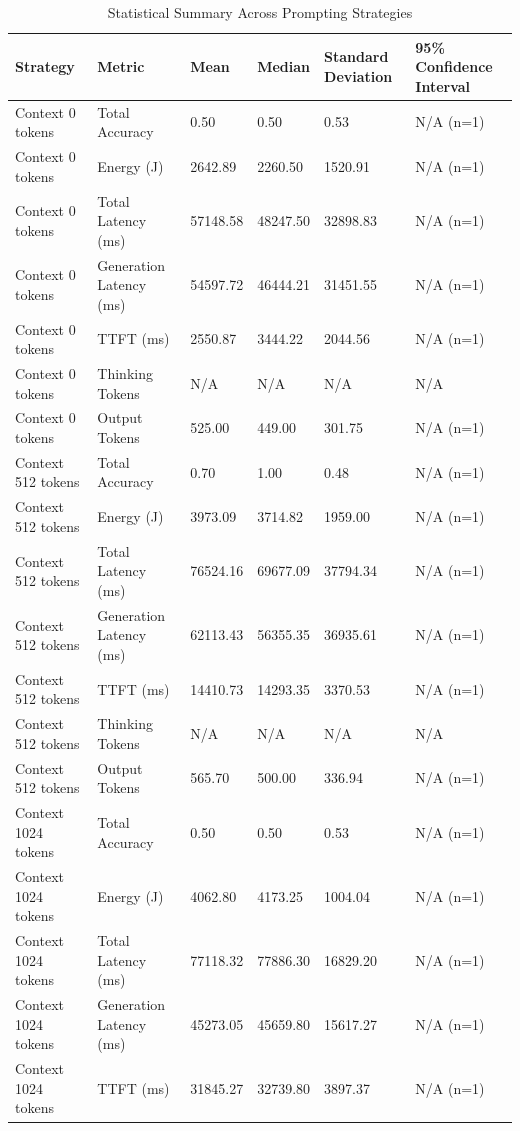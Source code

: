 \begin{table}
\caption{Statistical Summary Across Prompting Strategies}
\label{tab:statistical_summary}
\begin{tabular}{llllll}
\toprule
Strategy & Metric & Mean & Median & Standard Deviation & 95\% Confidence Interval \\
\midrule
Context 0 tokens & Total Accuracy & 0.50 & 0.50 & 0.53 & N/A (n=1) \\
Context 0 tokens & Energy (J) & 2642.89 & 2260.50 & 1520.91 & N/A (n=1) \\
Context 0 tokens & Total Latency (ms) & 57148.58 & 48247.50 & 32898.83 & N/A (n=1) \\
Context 0 tokens & Generation Latency (ms) & 54597.72 & 46444.21 & 31451.55 & N/A (n=1) \\
Context 0 tokens & TTFT (ms) & 2550.87 & 3444.22 & 2044.56 & N/A (n=1) \\
Context 0 tokens & Thinking Tokens & N/A & N/A & N/A & N/A \\
Context 0 tokens & Output Tokens & 525.00 & 449.00 & 301.75 & N/A (n=1) \\
Context 512 tokens & Total Accuracy & 0.70 & 1.00 & 0.48 & N/A (n=1) \\
Context 512 tokens & Energy (J) & 3973.09 & 3714.82 & 1959.00 & N/A (n=1) \\
Context 512 tokens & Total Latency (ms) & 76524.16 & 69677.09 & 37794.34 & N/A (n=1) \\
Context 512 tokens & Generation Latency (ms) & 62113.43 & 56355.35 & 36935.61 & N/A (n=1) \\
Context 512 tokens & TTFT (ms) & 14410.73 & 14293.35 & 3370.53 & N/A (n=1) \\
Context 512 tokens & Thinking Tokens & N/A & N/A & N/A & N/A \\
Context 512 tokens & Output Tokens & 565.70 & 500.00 & 336.94 & N/A (n=1) \\
Context 1024 tokens & Total Accuracy & 0.50 & 0.50 & 0.53 & N/A (n=1) \\
Context 1024 tokens & Energy (J) & 4062.80 & 4173.25 & 1004.04 & N/A (n=1) \\
Context 1024 tokens & Total Latency (ms) & 77118.32 & 77886.30 & 16829.20 & N/A (n=1) \\
Context 1024 tokens & Generation Latency (ms) & 45273.05 & 45659.80 & 15617.27 & N/A (n=1) \\
Context 1024 tokens & TTFT (ms) & 31845.27 & 32739.80 & 3897.37 & N/A (n=1) \\

\end{tabular}
\end{table}
